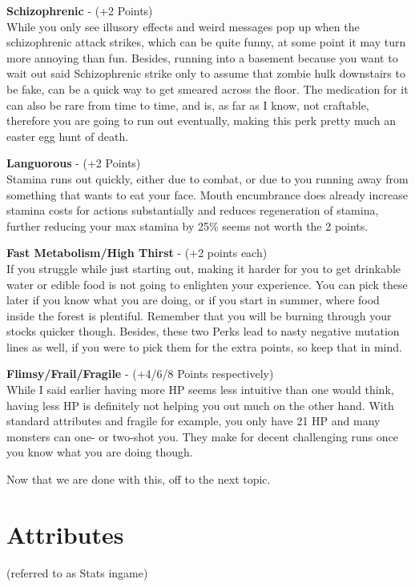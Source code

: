 \textbf{Schizophrenic} - (+2 Points)\\While you only see illusory effects and weird messages pop up when the schizophrenic attack strikes, which can be quite funny, at some point it may turn more annoying than fun. Besides, running into a basement because you want to wait out said Schizophrenic strike only to assume that zombie hulk downstairs to be fake, can be a quick way to get smeared across the floor. The medication for it can also be rare from time to time, and is, as far as I know, not craftable, therefore you are going to run out eventually, making this perk pretty much an easter egg hunt of death.

\textbf{Languorous} - (+2 Points)\\Stamina runs out quickly, either due to combat, or due to you running away from something that wants to eat your face. Mouth encumbrance does already increase stamina costs for actions substantially and reduces regeneration of stamina, further reducing your max stamina by 25\% seems not worth the 2 points.

\textbf{Fast Metabolism/High Thirst} - (+2 points each)\\If you struggle while just starting out, making it harder for you to get drinkable water or edible food is not going to enlighten your experience. You can pick these later if you know what you are doing, or if you start in summer, where food inside the forest is plentiful. Remember that you will be burning through your stocks quicker though.
Besides, these two Perks lead to nasty negative mutation lines as well, if you were to pick them for the extra points, so keep that in mind.

\textbf{Flimsy/Frail/Fragile} - (+4/6/8 Points respectively)\\While I said earlier having more HP seems less intuitive than one would think, having less HP is definitely not helping you out much on the other hand. With standard attributes and fragile for example, you only have 21 HP and many monsters can one- or two-shot you. They make for decent challenging runs once you know what you are doing though.

Now that we are done with this, off to the next topic.

\section{Attributes}

(referred to as Stats ingame)

